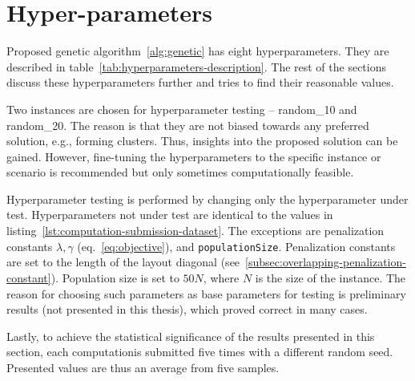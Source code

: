 \newpage


\section{Hyper-parameters}\label{sec:hyper-parameters}

Proposed genetic algorithm~\ref{alg:genetic} has eight hyperparameters.
They are described in table~\ref{tab:hyperparameters-description}.
The rest of the sections discuss these hyperparameters further and tries to find their reasonable values.

Two instances are chosen for hyperparameter testing – random\_10 and random\_20.
The reason is that they are not biased towards any preferred solution, e.g., forming clusters.
Thus, insights into the proposed solution can be gained.
However, fine-tuning the hyperparameters to the specific instance or scenario is recommended but only sometimes computationally feasible.

Hyperparameter testing is performed by changing only the hyperparameter under test.
Hyperparameters not under test are identical to the values in listing~\ref{lst:computation-submission-dataset}.
The exceptions are penalization constants $\lambda, \gamma$ (eq.~\ref{eq:objective}), and \verb|populationSize|.
Penalization constants are set to the length of the layout diagonal (see~\ref{subsec:overlapping-penalization-constant}).
Population size is set to $50N$, where $N$ is the size of the instance.
The reason for choosing such parameters as base parameters for testing
is preliminary results (not presented in this thesis), which proved correct in many cases.

Lastly, to achieve the statistical significance of the results presented in this section, each computation\footnotemark[1] is submitted five times with a different random seed.
Presented values are thus an average from five samples.



